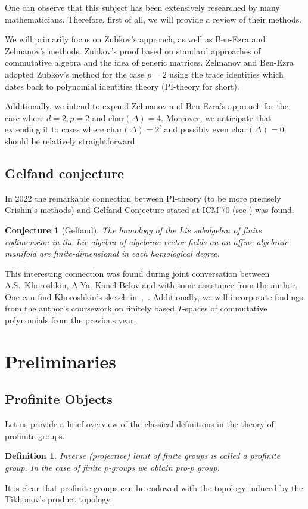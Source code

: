 \documentclass[12pt,a4paper]{article}
\newtheorem*{conjecture*}{Conjecture}
\newtheorem{definition}{Definition}[subsection]
\begin{document}
    One can observe that this subject has been extensively researched by many mathematicians.
    Therefore, first of all, we will provide a review of their methods.

    We will primarily focus on Zubkov's approach, as well as Ben-Ezra and Zelmanov's methods.
    Zubkov's proof based on standard approaches of commutative algebra and the idea of generic matrices.
    Zelmanov and Ben-Ezra adopted Zubkov's method for the case $p=2$ using the trace identities which dates back to polynomial identities theory (PI-theory for short).

    Additionally, we intend to expand Zelmanov and Ben-Ezra's approach for the case where $d=2, p=2$ and $\mathrm{char}(\Delta)=4$.
    Moreover, we anticipate that extending it to cases where $\mathrm{char}(\Delta)=2^l$ and possibly even $\mathrm{char}(\Delta)=0$ should be relatively straightforward.

    \subsection{Gelfand conjecture}
    In 2022 the remarkable connection between PI-theory (to be more precisely Grishin's methods) and Gelfand Conjecture stated at ICM’70 (see \cite{Gelfand}) was found.
    \vskip 0.1in\noindent
    \begin{conjecture*}[Gelfand]
        The homology of the Lie subalgebra of finite codimension in the Lie algebra of algebraic vector fields on an affine algebraic manifold are finite-dimensional in each
        homological degree.
    \end{conjecture*}
    \vskip 0.1in\noindent
    This interesting connection was found during joint conversation between A.S.\ Khoroshkin, A.Ya. Kanel-Belov and with some assistance from the author.
    One can find Khoroshkin's sketch in~\cite{Feigin-Kanel-Khoroshkin},~\cite{Centrone-Kanel-Khoroshkin-Vorobiov}.
    Additionally, we will incorporate findings from the author's coursework on finitely based $T$-spaces of commutative polynomials from the previous year.


    \section{Preliminaries}

    \subsection{Profinite Objects}
    Let us provide a brief overview of the classical definitions in the theory of profinite groups.
    \vskip 0.1in\noindent
    \begin{definition}
        Inverse (projective) limit of finite groups is called a profinite group.
        In the case of finite $p$-groups we obtain pro-$p$ group.
    \end{definition}
    \vskip 0.1in\noindent
    It is clear that profinite groups can be endowed with the topology induced by the Tikhonov's product topology.
\end{document}
